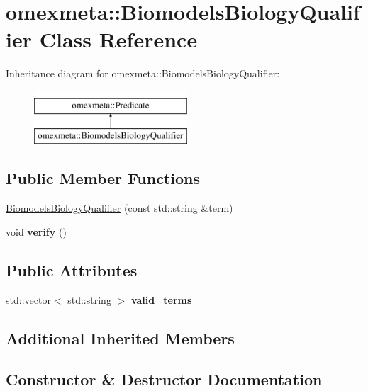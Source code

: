 \hypertarget{classomexmeta_1_1BiomodelsBiologyQualifier}{}\section{omexmeta\+:\+:Biomodels\+Biology\+Qualifier Class Reference}
\label{classomexmeta_1_1BiomodelsBiologyQualifier}
Inheritance diagram for omexmeta\+:\+:Biomodels\+Biology\+Qualifier\+:\begin{figure}[H]
\begin{center}
\leavevmode
\includegraphics[height=2.000000cm]{classomexmeta_1_1BiomodelsBiologyQualifier}
\end{center}
\end{figure}
\subsection*{Public Member Functions}
\begin{DoxyCompactItemize}
\item 
\hyperlink{classomexmeta_1_1BiomodelsBiologyQualifier_a4dfa8fd975ceba60da6d3ccabdfb4514}{Biomodels\+Biology\+Qualifier} (const std\+::string \&term)
\item 
\mbox{\label{classomexmeta_1_1BiomodelsBiologyQualifier_ade9766c18afa895e7c745aa4679ccfce}} 
void {\bfseries verify} ()
\end{DoxyCompactItemize}
\subsection*{Public Attributes}
\begin{DoxyCompactItemize}
\item 
std\+::vector$<$ std\+::string $>$ {\bfseries valid\+\_\+terms\+\_\+}
\end{DoxyCompactItemize}
\subsection*{Additional Inherited Members}


\subsection{Constructor \& Destructor Documentation}
\mbox{\label{classomexmeta_1_1BiomodelsBiologyQualifier_a4dfa8fd975ceba60da6d3ccabdfb4514}} 
